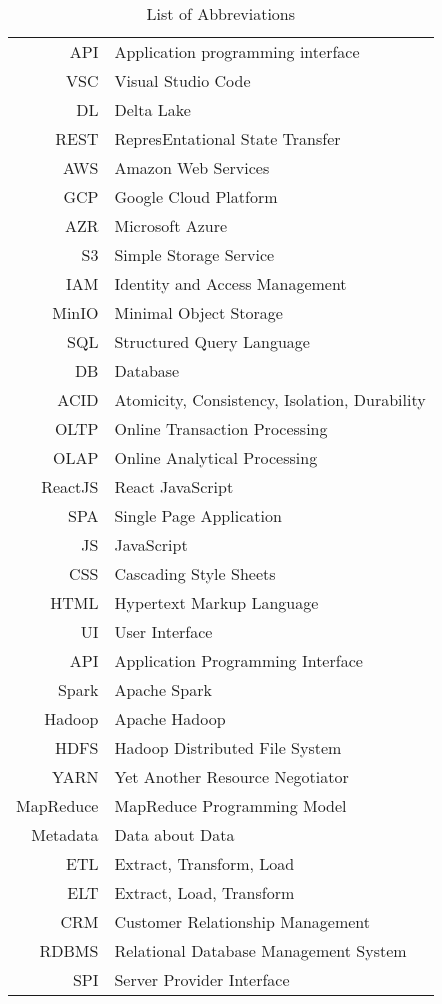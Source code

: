 \begin{longtable}{rl}
\caption{List of Abbreviations}\label{tab:abbreviations} \\
API & Application programming interface \\
VSC & Visual Studio Code \\
DL & Delta Lake \\
REST & RepresEntational State Transfer \\
AWS & Amazon Web Services \\
GCP & Google Cloud Platform \\
AZR & Microsoft Azure \\
S3 & Simple Storage Service \\
IAM & Identity and Access Management \\
MinIO & Minimal Object Storage \\
SQL & Structured Query Language \\
DB & Database \\
ACID & Atomicity, Consistency, Isolation, Durability \\
OLTP & Online Transaction Processing \\
OLAP & Online Analytical Processing \\
ReactJS & React JavaScript \\
SPA & Single Page Application \\
JS & JavaScript \\
CSS & Cascading Style Sheets \\
HTML & Hypertext Markup Language \\
UI & User Interface \\
API & Application Programming Interface \\
Spark & Apache Spark \\
Hadoop & Apache Hadoop \\
HDFS & Hadoop Distributed File System \\
YARN & Yet Another Resource Negotiator \\
MapReduce & MapReduce Programming Model \\
Metadata & Data about Data \\
ETL & Extract, Transform, Load \\
ELT & Extract, Load, Transform \\
CRM & Customer Relationship Management \\
RDBMS & Relational Database Management System \\
SPI & Server Provider Interface \\
\end{longtable}
